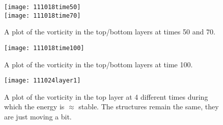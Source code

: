 \begin{description}
\begin{figure}%
\begin{center}
    \texttt{[image: 111018time50]}
    \\
    \texttt{[image: 111018time70]}
\end{center}
\caption{
A plot of the vorticity in the top/bottom layers at times 50 and 70.
        }
\label{f:111018time1}
\end{figure}

\begin{figure}%
\begin{center}
    \texttt{[image: 111018time100]}
\end{center}
\caption{
A plot of the vorticity in the top/bottom layers at time 100.
        }
\label{f:111018time2}
\end{figure}

\begin{figure}%
\begin{center}
    \texttt{[image: 111024layer1]}
\end{center}
\caption{
A plot of the vorticity in the top layer at 4 different times during
which the energy is $\approx$ stable. The structures remain the same,
they are just moving a bit.
        }
\label{f:111024layer1}
\end{figure}




\end{description}
